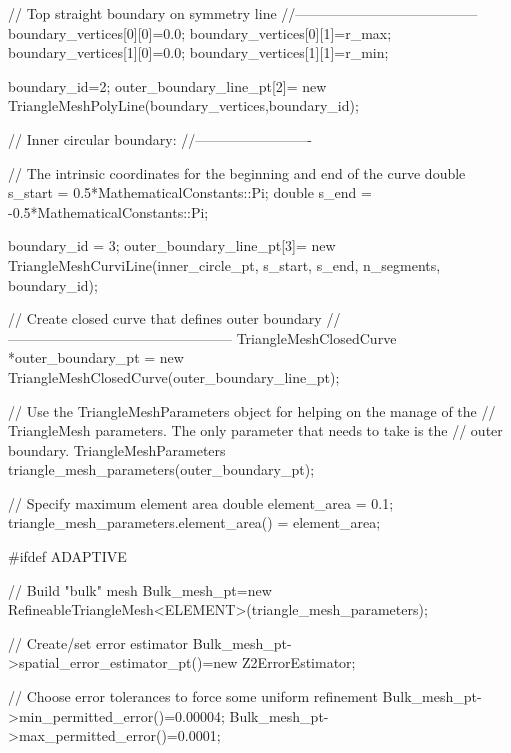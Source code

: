 \begin{DoxyCodeInclude}
 \textcolor{comment}{// Top straight boundary on symmetry line}
 \textcolor{comment}{//---------------------------------------}
 boundary\_vertices[0][0]=0.0;
 boundary\_vertices[0][1]=r\_max;
 boundary\_vertices[1][0]=0.0;
 boundary\_vertices[1][1]=r\_min;

 boundary\_id=2;
 outer\_boundary\_line\_pt[2]=
  \textcolor{keyword}{new} TriangleMeshPolyLine(boundary\_vertices,boundary\_id);
 

 \textcolor{comment}{// Inner circular boundary:}
 \textcolor{comment}{//-------------------------}
 
 \textcolor{comment}{// The intrinsic coordinates for the beginning and end of the curve}
 \textcolor{keywordtype}{double} s\_start =  0.5*MathematicalConstants::Pi;
 \textcolor{keywordtype}{double} s\_end   =  -0.5*MathematicalConstants::Pi;
 
 boundary\_id = 3;
 outer\_boundary\_line\_pt[3]=
  \textcolor{keyword}{new} TriangleMeshCurviLine(inner\_circle\_pt,
                            s\_start,
                            s\_end,
                            n\_segments,
                            boundary\_id);
 
 
 \textcolor{comment}{// Create closed curve that defines outer boundary}
 \textcolor{comment}{//------------------------------------------------}
 TriangleMeshClosedCurve *outer\_boundary\_pt =
  \textcolor{keyword}{new} TriangleMeshClosedCurve(outer\_boundary\_line\_pt);
 

 \textcolor{comment}{// Use the TriangleMeshParameters object for helping on the manage of the}
 \textcolor{comment}{// TriangleMesh parameters. The only parameter that needs to take is the}
 \textcolor{comment}{// outer boundary.}
 TriangleMeshParameters triangle\_mesh\_parameters(outer\_boundary\_pt);
 
 \textcolor{comment}{// Specify maximum element area}
 \textcolor{keywordtype}{double} element\_area = 0.1; 
 triangle\_mesh\_parameters.element\_area() = element\_area;
 
\textcolor{preprocessor}{#ifdef ADAPTIVE}
 
 \textcolor{comment}{// Build "bulk" mesh}
 Bulk\_mesh\_pt=\textcolor{keyword}{new} RefineableTriangleMesh<ELEMENT>(triangle\_mesh\_parameters);

 \textcolor{comment}{// Create/set error estimator}
 Bulk\_mesh\_pt->spatial\_error\_estimator\_pt()=\textcolor{keyword}{new} Z2ErrorEstimator;
 
 \textcolor{comment}{// Choose error tolerances to force some uniform refinement}
 Bulk\_mesh\_pt->min\_permitted\_error()=0.00004;
 Bulk\_mesh\_pt->max\_permitted\_error()=0.0001;


\end{DoxyCodeInclude}
